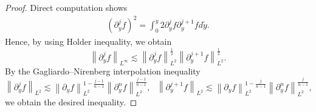 \documentclass[10pt,a4paper]{amsart}
\newcommand{\norm}[1]{\left\lVert#1\right\rVert}
\newcommand{\pa}{\partial}
\begin{document}
\begin{proof}
	Direct computation shows
    \begin{align*}
        (\pa_y^j f)^2 = \int_0^y 2\pa_y^j f \pa_y^{j+1} f d\tilde y.
    \end{align*}
    Hence, by using Holder inequality, we obtain
    \[
        \norm{\pa_y^j f}_{L^\infty} \lesssim \norm{\pa_y^j f}_{L^2}^{\frac{1}{2}}\norm{\pa_y^{j+1}f}_{L^2}^{\frac{1}{2}}.
    \]
    By the Gagliardo–Nirenberg interpolation inequality
    \[
        \norm{\pa_y^jf}_{L^2} \lesssim \norm{\pa_y f}_{L^2}^{1-\frac{j-1}{n-1}} \norm{\pa_y^n f}_{L^2}^{\frac{j-1}{n-1}}, \ \ \ 
        \norm{\pa_y^{j+1}f}_{L^2} \lesssim \norm{\pa_y f}_{L^2}^{1-\frac{j}{n-1}} \norm{\pa_y^n f}_{L^2}^{\frac{j}{n-1}}, 
    \]
    we obtain the desired inequality. 
\end{proof}
\end{document}
